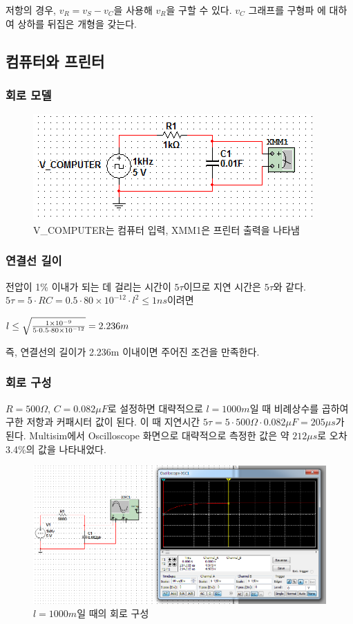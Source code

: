 \documentclass{article}
\begin{document}
저항의 경우, $v_R = v_S - v_C$을 사용해 $v_R$을 구할 수 있다. $v_C$ 그래프를 구형파
에 대하여 상하를 뒤집은 개형을 갖는다.


\subsection{컴퓨터와 프린터}

\subsubsection{회로 모델}
\begin{figure}[H]
\centering
\includegraphics[scale=0.74]{2-a-maybe}
\caption{V\_COMPUTER는 컴퓨터 입력, XMM1은 프린터 출력을 나타냄}
\end{figure}

\subsubsection{연결선 길이}
전압이 1\% 이내가 되는 데 걸리는 시간이 $5\tau$이므로 지연 시간은 $5\tau$와 같다.\\
$5\tau = 5 \cdot RC = 0.5 \cdot 80\times 10^{-12} \cdot l^2 \leq 1ns$이려면\\
\begin{center}
$l \leq \sqrt{1\times 10^{-9} \over {5 \cdot 0.5 \cdot 80\times 10^{-12}}} = 2.236 m$\\
\end{center}
즉, 연결선의 길이가 2.236m 이내이면 주어진 조건을 만족한다.

\subsubsection{회로 구성}
$R=500\Omega$, $C=0.082\mu F$로 설정하면 대략적으로 $l=1000m$일 때 비례상수를 곱하여 구한
저항과 커패시터 값이 된다.
이 때 지연시간 $5\tau = 5 \cdot 500\Omega \cdot 0.082\mu F = 205\mu s$가 된다. Multisim에서 
Oscilloscope 화면으로 대략적으로 측정한 값은 약 $212\mu s$로 오차 3.4\%의 값을 나타내었다.

\begin{figure}[h]
\centering
\includegraphics[scale=0.3]{2-b}
\caption{$l=1000m$일 때의 회로 구성}
\end{figure}
\end{document}
